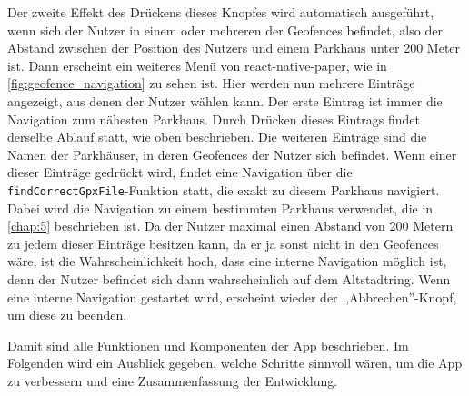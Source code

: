 Der zweite Effekt des Drückens dieses Knopfes wird automatisch ausgeführt, wenn sich der Nutzer in einem oder mehreren der Geofences befindet, also der Abstand zwischen der Position des Nutzers und einem Parkhaus unter 200 Meter ist. Dann erscheint ein weiteres Menü von react-native-paper, wie in \autoref{fig:geofence_navigation} zu sehen ist. Hier werden nun mehrere Einträge angezeigt, aus denen der Nutzer wählen kann. Der erste Eintrag ist immer die Navigation zum nähesten Parkhaus. Durch Drücken dieses Eintrags findet derselbe Ablauf statt, wie oben beschrieben. Die weiteren Einträge sind die Namen der Parkhäuser, in deren Geofences der Nutzer sich befindet. Wenn einer dieser Einträge gedrückt wird, findet eine Navigation über die \verb|findCorrectGpxFile|-Funktion statt, die exakt zu diesem Parkhaus navigiert. Dabei wird die Navigation zu einem bestimmten Parkhaus verwendet, die in \autoref{chap:5} beschrieben ist. Da der Nutzer maximal einen Abstand von 200 Metern zu jedem dieser Einträge besitzen kann, da er ja sonst nicht in den Geofences wäre, ist die Wahrscheinlichkeit hoch, dass eine interne Navigation möglich ist, denn der Nutzer befindet sich dann wahrscheinlich auf dem Altstadtring. Wenn eine interne Navigation gestartet wird, erscheint wieder der ,,Abbrechen''-Knopf, um diese zu beenden.

Damit sind alle Funktionen und Komponenten der App beschrieben. Im Folgenden wird ein Ausblick gegeben, welche Schritte sinnvoll wären, um die App zu verbessern und eine Zusammenfassung der Entwicklung.

